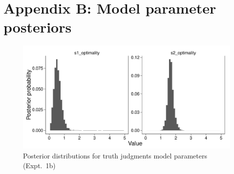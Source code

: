 \documentclass[12pt,letterpaper]{article}
\begin{document}

\newpage
\section*{Appendix B: Model parameter posteriors}


\begin{figure}[h]
\centering
    \includegraphics[width=\columnwidth]
    {familiar-truthjudgments-parameters.pdf}
    \caption{
    Posterior distributions for truth judgments model parameters (Expt.~1b)
}
  \label{fig:tj1-params}
\end{figure}
\end{document}
